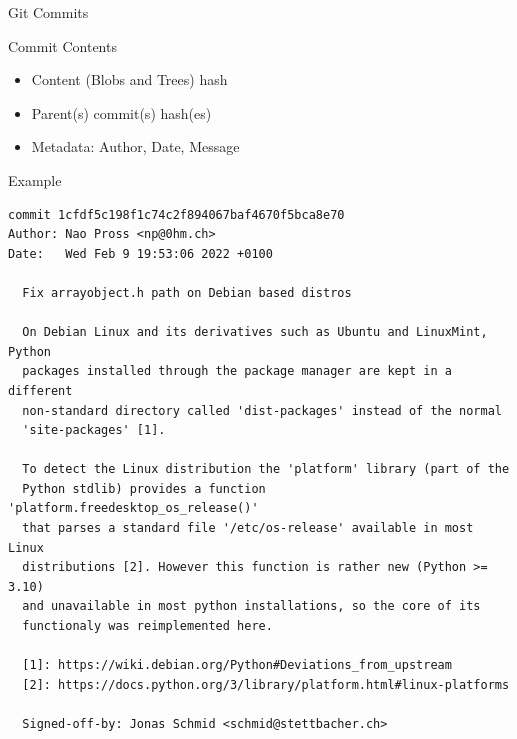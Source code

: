 \documentclass[xetex, handout]{beamer}
\begin{document}
\begin{frame}[fragile]{Git Commits}
  \begin{block}{Commit Contents}
    \begin{itemize}
      \item Content (Blobs and Trees) hash 
      \item Parent(s) commit(s) hash(es)
      \item Metadata: Author, Date, Message
    \end{itemize}
  \end{block}
  \begin{exampleblock}{Example}
  \centering\scriptsize
\begin{verbatim}
commit 1cfdf5c198f1c74c2f894067baf4670f5bca8e70
Author: Nao Pross <np@0hm.ch>
Date:   Wed Feb 9 19:53:06 2022 +0100

  Fix arrayobject.h path on Debian based distros
  
  On Debian Linux and its derivatives such as Ubuntu and LinuxMint, Python
  packages installed through the package manager are kept in a different
  non-standard directory called 'dist-packages' instead of the normal
  'site-packages' [1].
  
  To detect the Linux distribution the 'platform' library (part of the
  Python stdlib) provides a function 'platform.freedesktop_os_release()'
  that parses a standard file '/etc/os-release' available in most Linux
  distributions [2]. However this function is rather new (Python >= 3.10)
  and unavailable in most python installations, so the core of its
  functionaly was reimplemented here.
  
  [1]: https://wiki.debian.org/Python#Deviations_from_upstream
  [2]: https://docs.python.org/3/library/platform.html#linux-platforms
  
  Signed-off-by: Jonas Schmid <schmid@stettbacher.ch>
\end{verbatim}
  \end{exampleblock}
\end{frame}
\end{document}

